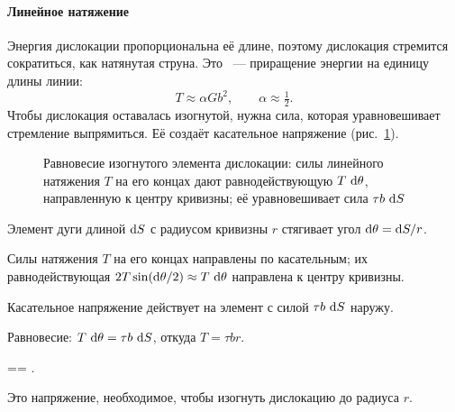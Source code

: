 \paragraph{Линейное натяжение}
Энергия дислокации пропорциональна её длине, поэтому дислокация
стремится сократиться, как натянутая струна. Это ~— приращение энергии на единицу длины линии:
\begin{equation}\label{eq:line-tension}
T\approx\alpha Gb^2,\qquad\alpha\approx\tfrac12 .
\end{equation}
Чтобы дислокация оставалась изогнутой, нужна сила, которая уравновешивает
стремление выпрямиться. Её создаёт касательное напряжение
(рис.~\ref{fig:bowed}).

\begin{figure}[ht]
\centering
{}
\caption{Равновесие изогнутого элемента дислокации: силы линейного
натяжения $T$ на его концах дают равнодействующую $T\,\mathop{}\!\mathrm{d}\theta$,
направленную к центру кривизны; её уравновешивает сила $\tau b\,\mathop{}\!\mathrm{d} S$}
\label{fig:bowed}
\end{figure}

\begin{shagi}
\item Элемент дуги длиной $\mathop{}\!\mathrm{d} S$ с радиусом кривизны $r$ стягивает угол
$\mathop{}\!\mathrm{d}\theta=\mathop{}\!\mathrm{d} S/r$.
\item Силы натяжения $T$ на его концах направлены по касательным; их
равнодействующая $2T\sin(\mathop{}\!\mathrm{d}\theta/2)\approx T\,\mathop{}\!\mathrm{d}\theta$ направлена к
центру кривизны.
\item Касательное напряжение действует на элемент с силой $\tau b\,\mathop{}\!\mathrm{d} S$
наружу.
\item Равновесие: $T\,\mathop{}\!\mathrm{d}\theta=\tau b\,\mathop{}\!\mathrm{d} S$, откуда $T=\tau br$.
\end{shagi}
\begin{keyeq}\label{eq:tau-r}
\tau== .
\end{keyeq}
Это напряжение, необходимое, чтобы изогнуть дислокацию до радиуса $r$.

